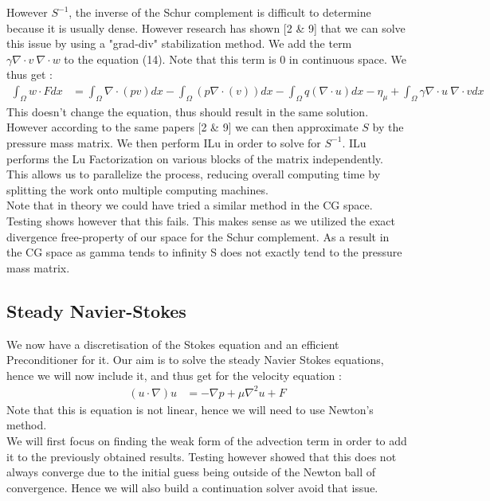 \documentclass[11pt,twoside,a4paper]{article}
\begin{document}
 However $S^{-1}$, the inverse of the Schur complement is difficult to determine because it is usually dense. However research has shown [2 \& 9] that we can solve this issue by using a "grad-div" stabilization method. We add the term $\gamma \nabla \cdot v \: \nabla \cdot w$ to the equation (14). Note that this term is 0 in continuous space. We thus get :
\begin{align}
\int_\Omega w \cdot F dx &= \int_\Omega \nabla \cdot (p v) dx - \int_\Omega ( p \nabla \cdot (v)) dx - \int_\Omega q (\nabla \cdot u) dx  - \eta_\mu + \int_\Omega \gamma \nabla \cdot u \: \nabla \cdot v dx
\end{align}
This doesn't change the equation, thus should result in the same solution. However according to the same papers [2 \& 9] we can then approximate $S$ by the pressure mass matrix. We then perform ILu in order to solve for $S^{-1}$. ILu performs the Lu Factorization on various blocks of the matrix independently. This allows us to parallelize the process, reducing overall computing time by splitting the work onto multiple computing machines.\\
Note that in theory we could have tried a similar method in the CG space.
Testing shows however that this fails.
This makes sense as we utilized the exact divergence free-property of our space for the Schur complement.
As a result in the CG space as gamma tends to infinity S does not exactly tend to the pressure mass matrix.

\subsection{Steady Navier-Stokes}
We now have a discretisation of the Stokes equation and an efficient Preconditioner for it.
Our aim is to solve the steady Navier Stokes equations, hence we will now include it, and thus get for the velocity equation :
\begin{align*}
(u \cdot \nabla) u &= -\nabla p + \mu \nabla^2 u + F
\end{align*}
Note that this is equation is not linear, hence we will need to use Newton's method.\\
We will first focus on finding the weak form of the advection term in order to add it to the previously obtained results. Testing however showed that this does not always converge due to the initial guess being outside of the Newton ball of convergence. Hence we will also build a continuation solver avoid that issue.
\end{document}
